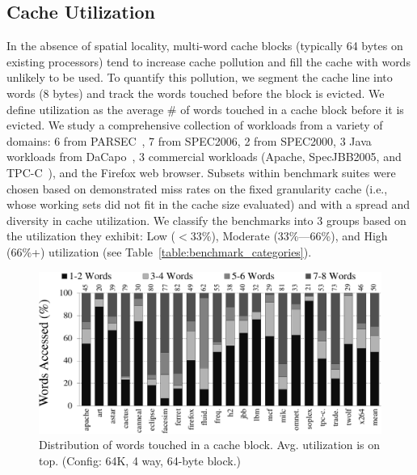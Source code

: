 \subsection{Cache Utilization}

In the absence of spatial locality, multi-word cache blocks (typically 64
bytes on existing processors) tend to increase cache pollution and fill the
cache with words unlikely to be used.  To quantify this pollution, we segment
the cache line into words (8 bytes) and track the words touched before the
block is evicted.  We define utilization as the average \# of words touched in
a cache block before it is evicted. We study a comprehensive collection of
workloads from a variety of domains: 6 from PARSEC~\cite{Bienia:2008:PBS:1454115.1454128}, 7 from
SPEC2006, 2 from SPEC2000, 3 Java workloads from DaCapo~\cite{Blackburn:2006:DBJ:1167473.1167488}, 3
commercial workloads (Apache, SpecJBB2005, and TPC-C~\cite{Llanos:2006:TOT:1228268.1228270}), and the
Firefox web browser.  Subsets within benchmark suites were chosen based on
demonstrated miss rates on the fixed granularity cache (i.e., whose working
sets did not fit in the cache size evaluated) and with a spread and diversity
in cache utilization.  We classify the benchmarks into 3 groups
based on the utilization they exhibit: Low ($<$33\%), Moderate (33\%---66\%),
and High (66\%+) utilization (see Table~\ref{table:benchmark_categories}).


\begin{figure}[!h]

 \begin{center}
  \includegraphics[width=\textwidth]{files/Plots/05-StackBar_Word_Access_64K.pdf}
  \caption[Distribution of words touched]{Distribution of words touched in a cache
    block. Avg. utilization is on top. (Config:
    64K, 4 way, 64-byte block.)}
  \label{fig:stackbar_words_64k}
 \end{center}

\end{figure}

